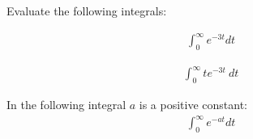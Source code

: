 

\begin{problem}
\item Evaluate the following integrals:

  \begin{subproblem}
  \item 
    \begin{eqnarray*}
      \int^\infty_0 e^{-3t} dt 
    \end{eqnarray*}
    \vfill

  \item 
    \begin{eqnarray*}
      \int^\infty_0 t e^{-3t} ~ dt
    \end{eqnarray*}
    \vfill
    
  \item In the following integral $a$ is a positive constant:
    \begin{eqnarray*}
      \int^\infty_0 e^{-at} dt 
    \end{eqnarray*}
    \vfill

  \end{subproblem}
\end{problem}

